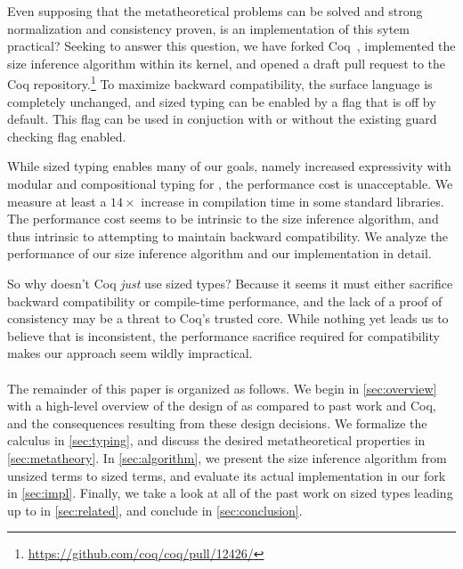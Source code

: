Even supposing that the metatheoretical problems can be solved and strong normalization and consistency proven,
is an implementation of this sytem practical?
Seeking to answer this question, we have forked Coq~\citep{impl}, implemented the size inference algorithm within its kernel,
and opened a draft pull request to the Coq repository.\footnote{\url{https://github.com/coq/coq/pull/12426/}}
To maximize backward compatibility, the surface language is completely unchanged,
and sized typing can be enabled by a flag that is off by default.
This flag can be used in conjuction with or without the existing guard checking flag enabled.

While sized typing enables many of our goals, namely increased expressivity with modular and compositional typing for \cofixpoints, the performance cost is unacceptable.
We measure at least a $14\times$ increase in compilation time in some standard libraries.
The performance cost seems to be intrinsic to the size inference algorithm, and thus intrinsic to attempting to maintain backward compatibility.
We analyze the performance of our size inference algorithm and our implementation in detail.

So why doesn't Coq \emph{just} use sized types?
Because it seems it must either sacrifice backward compatibility or compile-time performance,
and the lack of a proof of consistency may be a threat to Coq's trusted core.
While nothing yet leads us to believe that \lang is inconsistent,
the performance sacrifice required for compatibility makes our approach seem wildly impractical.

\paragraph*{} The remainder of this paper is organized as follows.
We begin in \autoref{sec:overview} with a high-level overview of the design of \lang as compared to past work and Coq,
and the consequences resulting from these design decisions.
We formalize the calculus \lang in \autoref{sec:typing},
and discuss the desired metatheoretical properties in \autoref{sec:metatheory}.
In \autoref{sec:algorithm}, we present the size inference algorithm from unsized terms to sized \lang terms,
and evaluate its actual implementation in our fork in \autoref{sec:impl}.
Finally, we take a look at all of the past work on sized types leading up to \lang in \autoref{sec:related}, and conclude in \autoref{sec:conclusion}.

